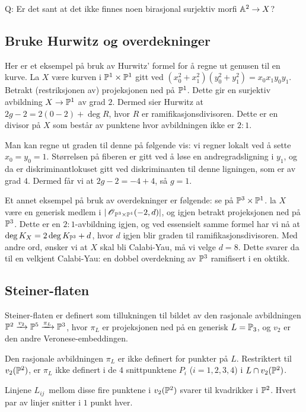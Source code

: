 \documentclass[11pt, norsk]{article}
\begin{document}
Q: Er det sant at det ikke finnes noen birasjonal surjektiv morfi $\mathbb{A}^2 \to X$? 

\subsection{Bruke Hurwitz og overdekninger}

Her er et eksempel på bruk av Hurwitz' formel for å regne ut genusen til en kurve. La $X$ være kurven i $\mathbb{P}^1 \times \mathbb{P}^1$ gitt ved $(x_0^2+x_1^2)(y_0^2+y_1^2)=x_0x_1y_0y_1$. Betrakt (restriksjonen av) projeksjonen ned på $\mathbb{P}^1$. Dette gir en surjektiv avbildning $X \to \mathbb{P}^1$ av grad $2$. Dermed sier Hurwitz at $2g-2=2(0-2)+\deg R$, hvor $R$ er ramifikasjonsdivisoren. Dette er en divisor på $X$ som består av punktene hvor avbildningen ikke er $2:1$. 

Man kan regne ut graden til denne på følgende vis: vi regner lokalt ved å sette $x_0=y_0=1$. Størrelsen på fiberen er gitt ved å løse en andregradsligning i $y_1$, og da er diskriminantlokuset gitt ved diskriminanten til denne ligningen, som er av grad $4$. Dermed får vi at $2g-2=-4+4$, så $g=1$.

Et annet eksempel på bruk av overdekninger er følgende: se på $\mathbb{P}^3 \times \mathbb{P}^1$. la $X$ være en generisk medlem i $|\operatorname{\mathscr{O}}_{\mathbb{P}^3 \times \mathbb{P}^1}(-2,d)|$, og igjen betrakt projeksjonen ned på $\mathbb{P}^3$. Dette er en $2:1$-avbildning igjen, og ved essensielt samme formel har vi nå at $\deg K_X = 2 \deg  K_{\mathbb{P}^3} + d$, hvor $d$ igjen blir graden til ramifikasjonsdivisoren. Med andre ord, ønsker vi at $X$ skal bli Calabi-Yau, må vi velge $d=8$. Dette svarer da til en velkjent Calabi-Yau: en dobbel overdekning av $\mathbb{P}^3$ ramifisert i en oktikk.

\subsection{Steiner-flaten}

Steiner-flaten er definert som tillukningen til bildet av den rasjonale avbildningen $\mathbb{P}^2 \xrightarrow{v_2} \mathbb{P}^5 \xrightarrow{\pi_L} \mathbb{P}^3$, hvor $\pi_L$ er projeksjonen ned på en generisk $L=\mathbb{P}_3$, og $v_2$ er den andre Veronese-embeddingen.

Den rasjonale avbildningen $\pi_L$ er ikke definert for punkter på $L$. Restriktert til $v_2(\mathbb{P}^2)$, er $\pi_L$ ikke definert i de $4$ snittpunktene $P_i$ ($i=1,2,3,4$) i $L \cap v_2(\mathbb{P}^2)$. 

Linjene $L_{ij}$ mellom disse fire punktene i $v_2(\mathbb{P}^2)$ svarer til kvadrikker i $\mathbb{P}^2$. Hvert par av linjer snitter i $1$ punkt hver. 
\end{document}
